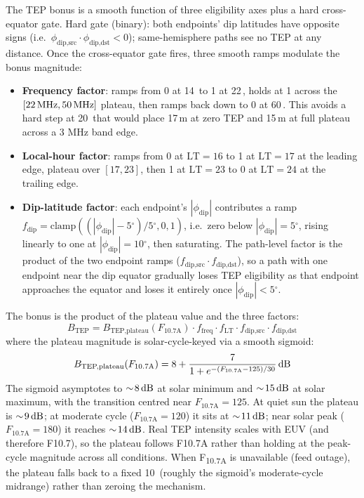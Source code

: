 \documentclass[11pt,a4paper]{article}
\newcommand{\SI}[2]{#1\,\text{#2}}
\newcommand{\si}[1]{\text{#1}}
\newcommand{\dB}{\text{dB}}
\newcommand{\MHz}{\text{MHz}}
\newcommand{\degree}{\ensuremath{{}^\circ}}
\begin{document}
The TEP bonus is a smooth function of three eligibility axes plus a
hard cross-equator gate.  Hard gate (binary): both endpoints' dip
latitudes have opposite signs (i.e.\ $\phi_{\text{dip,src}} \cdot
\phi_{\text{dip,dst}} < 0$); same-hemisphere paths see no TEP at any
distance.  Once the cross-equator gate fires, three smooth ramps
modulate the bonus magnitude:
\begin{itemize}[nosep]
  \item \textbf{Frequency factor}: ramps from 0 at \SI{14}{\MHz} to
        1 at \SI{22}{\MHz}, holds at 1 across the
        $[\SI{22}{\MHz}, \SI{50}{\MHz}]$ plateau, then ramps back
        down to 0 at \SI{60}{\MHz}.  This avoids a hard
        step at \SI{20}{\MHz} that would place 17\,m at zero TEP and
        15\,m at full plateau across a 3 MHz band edge.
  \item \textbf{Local-hour factor}: ramps from 0 at $\text{LT}=16$ to 1
        at $\text{LT}=17$ at the leading edge, plateau over $[17, 23]$,
        then 1 at $\text{LT}=23$ to 0 at $\text{LT}=24$ at the
        trailing edge.
  \item \textbf{Dip-latitude factor}: each endpoint's
        $|\phi_{\text{dip}}|$ contributes a ramp $f_{\text{dip}} =
        \mathrm{clamp}((|\phi_{\text{dip}}| - 5\degree) / 5\degree,
        0, 1)$, i.e.\ zero below $|\phi_{\text{dip}}| = 5\degree$,
        rising linearly to one at $|\phi_{\text{dip}}| =
        10\degree$, then saturating.  The path-level factor is the
        product of the two endpoint ramps
        ($f_{\text{dip,src}} \cdot f_{\text{dip,dst}}$), so a path
        with one endpoint near the dip equator gradually loses TEP
        eligibility as that endpoint approaches the equator and
        loses it entirely once $|\phi_{\text{dip}}| < 5\degree$.
\end{itemize}
The bonus is the product of the plateau value and the three
factors:
\begin{equation}\label{eq:tep}
  B_{\text{TEP}} =
    B_{\text{TEP,plateau}}(F_{10.7\text{A}}) \cdot f_{\text{freq}} \cdot
    f_{\text{LT}} \cdot f_{\text{dip,src}} \cdot f_{\text{dip,dst}}
\end{equation}
where the plateau magnitude is solar-cycle-keyed via a smooth
sigmoid:
\begin{equation}\label{eq:tepplateau}
  B_{\text{TEP,plateau}}(F_{10.7\text{A}}) =
    8 + \frac{7}{1 + e^{-(F_{10.7\text{A}} - 125)/30}} \,\si{\dB}
\end{equation}
The sigmoid asymptotes to $\sim\!8\,\si{\dB}$ at solar minimum and
$\sim\!15\,\si{\dB}$ at solar maximum, with the transition centred
near $F_{10.7\text{A}} = 125$.  At quiet sun the plateau is
$\sim\!9\,\si{\dB}$; at moderate cycle ($F_{10.7\text{A}} = 120$)
it sits at $\sim\!11\,\si{\dB}$; near solar peak ($F_{10.7\text{A}}
= 180$) it reaches $\sim\!14\,\si{\dB}$.  Real TEP intensity scales
with EUV (and therefore F10.7), so the plateau follows F10.7A
rather than holding at the peak-cycle magnitude across all
conditions.  When F\textsubscript{10.7A} is unavailable (feed
outage), the plateau falls back to a fixed \SI{10}{\dB}
(roughly the sigmoid's moderate-cycle midrange) rather than
zeroing the mechanism.
\end{document}

